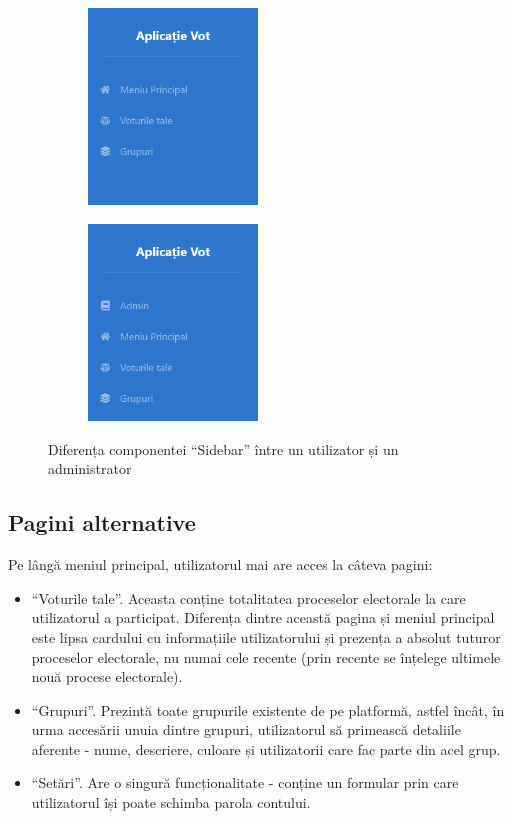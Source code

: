 \begin{figure}
\centering
\begin{subfigure}{.5\textwidth}
    \centering
    \includegraphics[width=45mm]{images/sidebar_normal.png}
\end{subfigure}%
\begin{subfigure}{.5\textwidth}
    \centering
    \includegraphics[width=45mm]{images/sidebar_admin.png}
\end{subfigure}
    \caption{Diferența componentei \enquote{Sidebar} între un utilizator și un administrator}
\end{figure}

\subsection{Pagini alternative}

Pe lângă meniul principal, utilizatorul mai are acces la câteva pagini:

\begin{itemize}
    \item \enquote{Voturile tale}. Aceasta conține totalitatea proceselor electorale la care utilizatorul a participat. Diferența dintre această pagina și meniul principal este lipsa cardului cu informațiile utilizatorului și prezența a absolut tuturor proceselor electorale, nu numai cele recente (prin recente se înțelege ultimele nouă procese electorale).
    \item \enquote{Grupuri}. Prezintă toate grupurile existente de pe platformă, astfel încât, în urma accesării unuia dintre grupuri, utilizatorul să primească detaliile aferente - nume, descriere, culoare și utilizatorii care fac parte din acel grup.
    \item \enquote{Setări}. Are o singură funcționalitate - conține un formular prin care utilizatorul își poate schimba parola contului.
\end{itemize}

